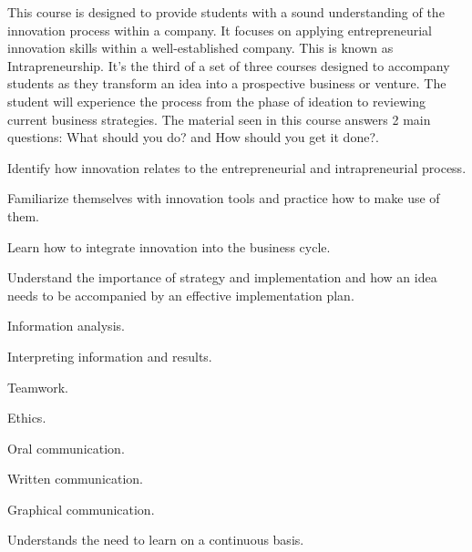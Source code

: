 \begin{syllabus}


\begin{justification}
This course is designed to provide students with a sound understanding of the innovation process within a company. It focuses on applying entrepreneurial innovation skills within a well-established company. This is known as Intrapreneurship.
It's the third of a set of three courses designed to accompany students as they transform an idea into a prospective business or venture. The student will experience the process from the phase of ideation to reviewing current business strategies. 
The material seen in this course answers 2 main questions: What should you do? and How should you get it done?. 
\end{justification}

\begin{goals}
\item Identify how innovation relates to the entrepreneurial and intrapreneurial process.
\item Familiarize themselves with innovation tools and practice how to make use of them.
\item Learn how to integrate innovation into the business cycle.
\item Understand the importance of strategy and implementation and how an idea needs to be accompanied by an effective implementation plan.
\item Information analysis.
\item Interpreting information and results.
\item Teamwork.
\item Ethics.
\item Oral communication.
\item Written communication.
\item Graphical communication.
\item Understands the need to learn on a continuous basis.

\end{goals}

\begin{outcomes}
    \item {}
    \item {}
\end{outcomes}

\begin{competences}
    \item {}
\end{competences}



\end{syllabus}
